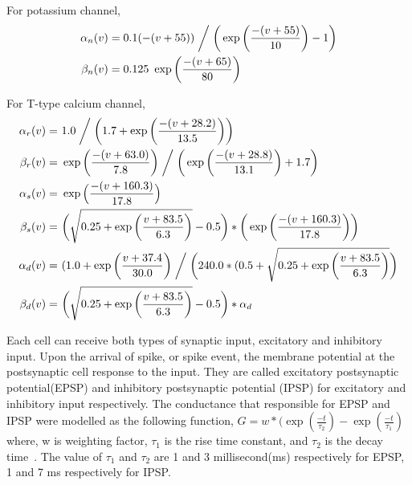 For potassium channel, %
\begin{align*}
\alpha_{n}(v)&=0.1(-(v+55))  \biggm/  \bigg( \exp \bigg( \frac{-(v+55)}{10} \bigg) - 1 \bigg)\\
\beta_{n}(v)&=0.125\ \exp \bigg(\frac{-(v+65)}{80}\bigg)\\
\end{align*}

For T-type calcium channel, %
\begin{align*} %
\alpha_{r}(v) =&\ 1.0\biggm/ \bigg(1.7+\exp\bigg(\frac{-(v+28.2)}{13.5}\bigg)\bigg)  \\
\beta_{r}(v) =&\ \exp\bigg(\frac{-(v+63.0)}{7.8}\bigg) \biggm/  \bigg( \exp \bigg( \frac{-(v+28.8)}{13.1} \bigg) +1.7\bigg)\\
\alpha_{s}(v) =&\ \exp \Big(\frac{-(v+160.3)}{17.8}\Big)\\
\beta_{s}(v) =&\ \bigg(\sqrt{0.25+\exp\bigg(\frac{v+83.5}{6.3}\bigg)}-0.5\bigg) *  \bigg(\exp\bigg(\frac{-(v+160.3)}{17.8}\bigg)\bigg)\\
\alpha_{d}(v) =&\ (1.0+\exp\bigg(\frac{v+37.4}{30.0}\bigg) \biggm/ \bigg(240.0*(0.5+ \sqrt{0.25+\exp\bigg(\frac{v+83.5}{6.3} \bigg) } \bigg) \\
\beta_{d}(v) =&\ \bigg(\sqrt{0.25+\exp\bigg(\frac{v+83.5}{6.3} \bigg) } -0.5\bigg)*\alpha_d\\  
\end{align*}

%
%
%
%

Each cell can receive both types of synaptic input, excitatory  and inhibitory input. Upon the arrival of spike, or spike event, the membrane potential at the postsynaptic cell response to the input. They are called excitatory postsynaptic potential(EPSP) and inhibitory postsynaptic potential (IPSP) for excitatory and inhibitory input respectively. 
The conductance that responsible for EPSP and IPSP were modelled as the following function,
$G = w*(\exp(\frac{-t}{\tau_2} ) - \exp(\frac{-t}{\tau_1})$
where, w is weighting factor, $\tau_1$ is the rise time constant, and $\tau_2$ is the decay time~\cite {carnevale2006neuron}.
The value of $\tau_1$ and $\tau_2$  are 1 and 3 millisecond(ms) respectively for EPSP, 1 and 7 ms respectively for IPSP.



